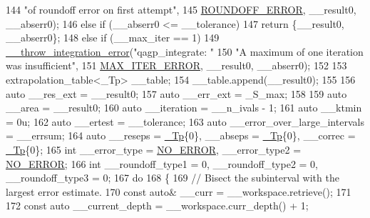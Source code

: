 \begin{DoxyCode}
144                                   \textcolor{stringliteral}{"of roundoff error on first attempt"},
145                                   \hyperlink{namespace____gnu__cxx_ad6c62dd86a596716cece6ac2d4cfd4b3a29574de87143c7715e9a138d7340e8ae}{ROUNDOFF\_ERROR}, \_\_result0, \_\_abserr0);
146       \textcolor{keywordflow}{else} \textcolor{keywordflow}{if} (\_\_abserr0 <= \_\_tolerance)
147         \textcolor{keywordflow}{return} \{\_\_result0, \_\_abserr0\};
148       \textcolor{keywordflow}{else} \textcolor{keywordflow}{if} (\_\_max\_iter == 1)
149         \hyperlink{namespace____gnu__cxx_a2ae22137ca092b8ae10f4d42b4e32cfb}{\_\_throw\_integration\_error}(\textcolor{stringliteral}{"qagp\_integrate: "}
150                                   \textcolor{stringliteral}{"A maximum of one iteration was insufficient"},
151                                   \hyperlink{namespace____gnu__cxx_ad6c62dd86a596716cece6ac2d4cfd4b3a420d46d10205dd953d0ccce5323afc4c}{MAX\_ITER\_ERROR}, \_\_result0, \_\_abserr0);
152 
153       extrapolation\_table<\_Tp> \_\_table;
154       \_\_table.append(\_\_result0);
155 
156       \textcolor{keyword}{auto} \_\_res\_ext = \_\_result0;
157       \textcolor{keyword}{auto} \_\_err\_ext = \_S\_max;
158 
159       \textcolor{keyword}{auto} \_\_area = \_\_result0;
160       \textcolor{keyword}{auto} \_\_iteration = \_\_n\_ivals - 1;
161       \textcolor{keyword}{auto} \_\_ktmin = 0u;
162       \textcolor{keyword}{auto} \_\_ertest = \_\_tolerance;
163       \textcolor{keyword}{auto} \_\_error\_over\_large\_intervals = \_\_errsum;
164       \textcolor{keyword}{auto} \_\_reseps = \hyperlink{namespace____gnu__cxx_a3b19a9c800ca194374ef9172290f7d79}{\_Tp}\{0\}, \_\_abseps = \hyperlink{namespace____gnu__cxx_a3b19a9c800ca194374ef9172290f7d79}{\_Tp}\{0\}, \_\_correc = \hyperlink{namespace____gnu__cxx_a3b19a9c800ca194374ef9172290f7d79}{\_Tp}\{0\};
165       \textcolor{keywordtype}{int} \_\_error\_type = \hyperlink{namespace____gnu__cxx_ad6c62dd86a596716cece6ac2d4cfd4b3ac31eecc280b10dec2efb4a2216ccc2e0}{NO\_ERROR}, \_\_error\_type2 = \hyperlink{namespace____gnu__cxx_ad6c62dd86a596716cece6ac2d4cfd4b3ac31eecc280b10dec2efb4a2216ccc2e0}{NO\_ERROR};
166       \textcolor{keywordtype}{int} \_\_roundoff\_type1 = 0, \_\_roundoff\_type2 = 0, \_\_roundoff\_type3 = 0;
167       \textcolor{keywordflow}{do}
168         \{
169           \textcolor{comment}{// Bisect the subinterval with the largest error estimate.}
170           \textcolor{keyword}{const} \textcolor{keyword}{auto}& \_\_curr = \_\_workspace.retrieve();
171 
172           \textcolor{keyword}{const} \textcolor{keyword}{auto} \_\_current\_depth = \_\_workspace.curr\_depth() + 1;

\end{DoxyCode}
